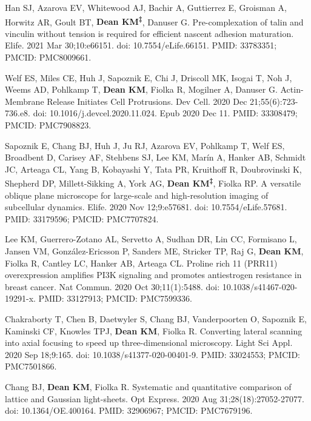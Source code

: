 \begin{etaremune}
\item Han SJ, Azarova EV, Whitewood AJ, Bachir A, Guttierrez E, Groisman A, Horwitz AR, Goult BT, \textbf{Dean KM\textsuperscript{‡}}, Danuser G. Pre-complexation of talin and vinculin without tension is required for efficient nascent adhesion maturation. Elife. 2021 Mar 30;10:e66151. doi: 10.7554/eLife.66151. PMID: 33783351; PMCID: PMC8009661.

\item Welf ES, Miles CE, Huh J, Sapoznik E, Chi J, Driscoll MK, Isogai T, Noh J, Weems AD, Pohlkamp T, \textbf{Dean KM}, Fiolka R, Mogilner A, Danuser G. Actin-Membrane Release Initiates Cell Protrusions. Dev Cell. 2020 Dec 21;55(6):723-736.e8. doi: 10.1016/j.devcel.2020.11.024. Epub 2020 Dec 11. PMID: 33308479; PMCID: PMC7908823.

\item  Sapoznik E, Chang BJ, Huh J, Ju RJ, Azarova EV, Pohlkamp T, Welf ES, Broadbent D, Carisey AF, Stehbens SJ, Lee KM, Marín A, Hanker AB, Schmidt JC, Arteaga CL, Yang B, Kobayashi Y, Tata PR, Kruithoff R, Doubrovinski K, Shepherd DP, Millett-Sikking A, York AG, \textbf{Dean KM\textsuperscript{‡}}, Fiolka RP. A versatile oblique plane microscope for large-scale and high-resolution imaging of subcellular dynamics. Elife. 2020 Nov 12;9:e57681. doi: 10.7554/eLife.57681. PMID: 33179596; PMCID: PMC7707824.

\item Lee KM, Guerrero-Zotano AL, Servetto A, Sudhan DR, Lin CC, Formisano L, Jansen VM, González-Ericsson P, Sanders ME, Stricker TP, Raj G, \textbf{Dean KM}, Fiolka R, Cantley LC, Hanker AB, Arteaga CL. Proline rich 11 (PRR11) overexpression amplifies PI3K signaling and promotes antiestrogen resistance in breast cancer. Nat Commun. 2020 Oct 30;11(1):5488. doi: 10.1038/s41467-020-19291-x. PMID: 33127913; PMCID: PMC7599336.

\item Chakraborty T, Chen B, Daetwyler S, Chang BJ, Vanderpoorten O, Sapoznik E, Kaminski CF, Knowles TPJ, \textbf{Dean KM}, Fiolka R. Converting lateral scanning into axial focusing to speed up three-dimensional microscopy. Light Sci Appl. 2020 Sep 18;9:165. doi: 10.1038/s41377-020-00401-9. PMID: 33024553; PMCID: PMC7501866.

\item Chang BJ, \textbf{Dean KM}, Fiolka R. Systematic and quantitative comparison of lattice and Gaussian light-sheets. Opt Express. 2020 Aug 31;28(18):27052-27077. doi: 10.1364/OE.400164. PMID: 32906967; PMCID: PMC7679196.


\end{etaremune}
